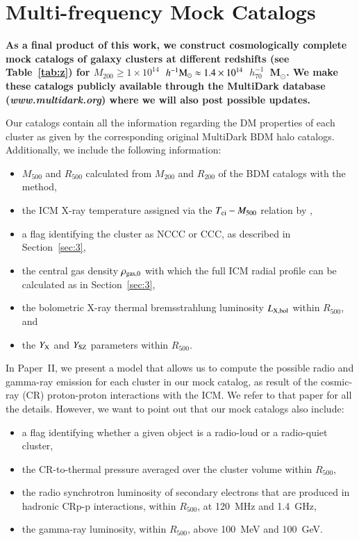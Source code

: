 \documentclass[useAMS,usenatbib]{mn2e}
\begin{document}
\section{Multi-frequency Mock Catalogs}
\label{sec:6}

{\bf As a final product of this work, we construct cosmologically complete mock
  catalogs of galaxy clusters at different redshifts (see Table~\ref{tab:z}) for
  $M_{200}\geq1\times10^{14}$~$h^{-1}{\mathrm{M}}_{\odot}
  \approx1.4\times10^{14}$~$h_{70}^{-1}$~M$_{\odot}$.  We make these catalogs
  publicly available through the MultiDark database (\textit{www.multidark.org})
  where we will also post possible updates.

  Our catalogs contain all the information regarding the DM properties of each
  cluster as given by the corresponding original MultiDark BDM halo
  catalogs. Additionally, we include the following information:

\begin{itemize}
\item $M_{500}$ and $R_{500}$ calculated from $M_{200}$ and $R_{200}$ of the BDM catalogs with the \cite{2003ApJ...584..702H} method,
\item the ICM X-ray temperature assigned via the $T_{{\mathrm{ci}}}-M_{500}$ relation by \cite{2010MNRAS.406.1773M},
\item a flag identifying the cluster as NCCC or CCC, as described in Section~\ref{sec:3},
\item the central gas density $\rho_{{\mathrm{gas}},0}$ with which the full ICM radial profile can be calculated as in Section~\ref{sec:3},
\item the bolometric X-ray thermal bremsstrahlung luminosity $L_{{\mathrm{X, bol}}}$
  within $R_{500}$, and
\item the $Y_{{\mathrm{X}}}$ and $Y_{{\mathrm{SZ}}}$ parameters within $R_{500}$.
\end{itemize}

In Paper~II, we present a model that allows us to compute the possible radio and
gamma-ray emission for each cluster in our mock catalog, as result of the
cosmic-ray (CR) proton-proton interactions with the ICM. We refer to that paper
for all the details. However, we want to point out that our mock catalogs also
include:

\begin{itemize}
\item a flag identifying whether a given object is a radio-loud or a radio-quiet cluster, 
\item the CR-to-thermal pressure averaged over the cluster volume within $R_{500}$,
\item the radio synchrotron luminosity of secondary electrons that are produced
  in hadronic CRp-p interactions, within $R_{500}$, at 120~MHz and 1.4~GHz,
\item the gamma-ray luminosity, within $R_{500}$, above 100~MeV and 100~GeV.
\end{itemize}

}
\end{document}
